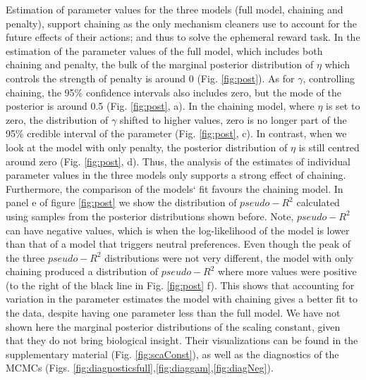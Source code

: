 \documentclass[]{rsos}%
\begin{document}
Estimation of parameter values for the three models (full model,
chaining and penalty), support chaining as the only mechanism
cleaners use to account for the future effects of their actions;
and thus to solve the ephemeral reward task. In the estimation of the
parameter values of the full model, which includes both chaining and
penalty, the bulk of the marginal posterior distribution of \(\eta\) which
controls the strength of penalty is around 0 (Fig. \ref{fig:post}).
As for \(\gamma\), controlling chaining, the 95\% confidence
intervals also includes zero, but the mode of the posterior
is around 0.5 (Fig. \ref{fig:post}, a). In the chaining model,
where \(\eta\) is set to zero, the distribution of \(\gamma\) shifted
to higher values, zero is no longer part of the 95\% credible interval
of the parameter (Fig. \ref{fig:post}, c). In contrast, when we
look at the model with only penalty, the posterior distribution
of \(\eta\) is still centred around zero (Fig. \ref{fig:post}, d).
Thus, the analysis of the estimates of individual parameter
values in the three models only supports a strong
effect of chaining. Furthermore, the comparison of the models` fit
favours the chaining model. In panel e of figure \ref{fig:post}
we show the distribution of \(pseudo-R^2\) calculated using
samples from the posterior distributions shown before.
Note, \(pseudo-R^2\) can have negative values, which is when
the log-likelihood of the model is lower than that of a model that
triggers neutral preferences. Even though the peak of the three
\(pseudo-R^2\) distributions were not very different, the model with only
chaining produced a distribution of \(pseudo-R^2\) where more values
were positive (to the right of the black line in Fig. \ref{fig:post} f). This
shows that accounting for variation in the parameter estimates the
model with chaining gives a better fit to the data, despite
having one parameter less than the full model. We have not shown
here the marginal posterior distributions of the scaling constant,
given that they do not bring biological insight.
Their visualizations can be found in the supplementary
material (Fig. \ref{fig:scaConst}), as well as the diagnostics of the MCMCs
(Figs. \ref{fig:diagnosticsfull},\ref{fig:diaggam},\ref{fig:diagNeg}).
\end{document}
